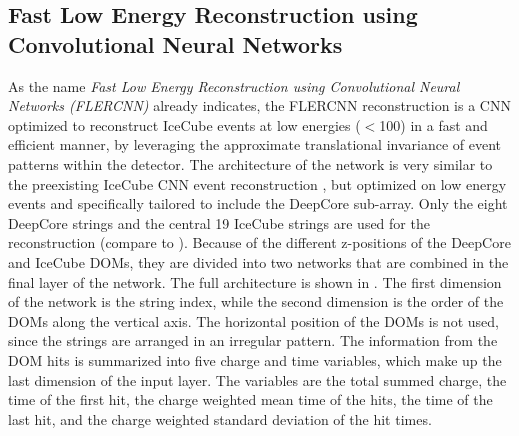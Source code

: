 \subsection{Fast Low Energy Reconstruction using Convolutional Neural Networks} 

As the name \textit{Fast Low Energy Reconstruction using Convolutional Neural Networks (FLERCNN)} already indicates, the FLERCNN reconstruction  is a CNN optimized to reconstruct IceCube events at low energies ($<$\SI{100}{\gev}) in a fast and efficient manner, by leveraging the approximate translational invariance of event patterns within the detector.
The architecture of the network is very similar to the preexisting IceCube CNN event reconstruction , but optimized on low energy events and specifically tailored to include the DeepCore sub-array. Only the eight DeepCore strings and the central 19 IceCube strings are used for the reconstruction (compare to ). Because of the different z-positions of the DeepCore and IceCube DOMs, they are divided into two networks that are combined in the final layer of the network. The full architecture is shown in . The first dimension of the network is the string index, while the second dimension is the order of the DOMs along the vertical axis. The horizontal position of the DOMs is not used, since the strings are arranged in an irregular pattern. The information from the DOM hits is summarized into five charge and time variables, which make up the last dimension of the input layer. The variables are the total summed charge, the time of the first hit, the charge weighted mean time of the hits, the time of the last hit, and the charge weighted standard deviation of the hit times.

